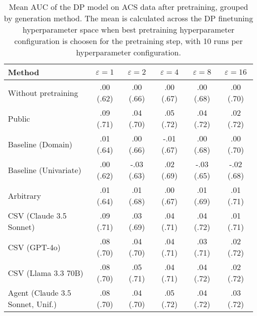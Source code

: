 \begin{table}[h!]
    \centering
    \caption{Mean AUC of the DP model on ACS data after pretraining, grouped by generation method. The mean is calculated across the DP finetuning hyperparameter space when best pretraining hyperparameter configuration is choosen for the pretraining step, with 10 runs per hyperparameter configuration.}
    \label{tab:epsilon_comparison}
    \begin{tabular}{lccccc}
    \toprule
    Method & $\varepsilon=1$ & $\varepsilon=2$ & $\varepsilon=4$ & $\varepsilon=8$ & $\varepsilon=16$ \\
    \midrule
    Without pretraining & .00 {\small (.62)} & .00 {\small (.66)} & .00 {\small (.67)} & .00 {\small (.68)} & .00 {\small (.70)} \\
    \arrayrulecolor{black!50!}\midrule
    Public & \cellcolor{bronze!30}.09 {\small (.71)} & \cellcolor{bronze!30}.04 {\small (.70)} & \cellcolor{bronze!30}.05 {\small (.72)} & .04 {\small (.72)} & .02 {\small (.72)} \\
    \arrayrulecolor{black!50!}\midrule
    Baseline (Domain) & .01 {\small (.64)} & .00 {\small (.66)} & -.01 {\small (.67)} & .00 {\small (.68)} & .00 {\small (.70)} \\
    Baseline (Univariate) & .00 {\small (.62)} & -.03 {\small (.63)} & .02 {\small (.69)} & -.03 {\small (.65)} & -.02 {\small (.68)} \\
    \arrayrulecolor{black!50!}\midrule
    Arbitrary & .01 {\small (.64)} & .01 {\small (.68)} & .00 {\small (.67)} & .01 {\small (.69)} & .01 {\small (.71)} \\
    \arrayrulecolor{black!50!}\midrule
    CSV (Claude 3.5 Sonnet) & \cellcolor{silver!30}.09 {\small (.71)} & .03 {\small (.69)} & .04 {\small (.71)} & \cellcolor{bronze!30}.04 {\small (.72)} & .01 {\small (.71)} \\
    CSV (GPT-4o) & .08 {\small (.70)} & .04 {\small (.70)} & .04 {\small (.71)} & .03 {\small (.71)} & \cellcolor{silver!30}.02 {\small (.72)} \\
    CSV (Llama 3.3 70B) & .08 {\small (.70)} & \cellcolor{gold!30}.05 {\small (.71)} & .04 {\small (.71)} & .04 {\small (.72)} & \cellcolor{bronze!30}.02 {\small (.72)} \\
    \arrayrulecolor{black!50!}\midrule
    Agent (Claude 3.5 Sonnet, Unif.) & .08 {\small (.70)} & .04 {\small (.70)} & \cellcolor{gold!30}.05 {\small (.72)} & \cellcolor{silver!30}.04 {\small (.72)} & \cellcolor{gold!30}.03 {\small (.72)} \\

\end{tabular}
\end{table}
